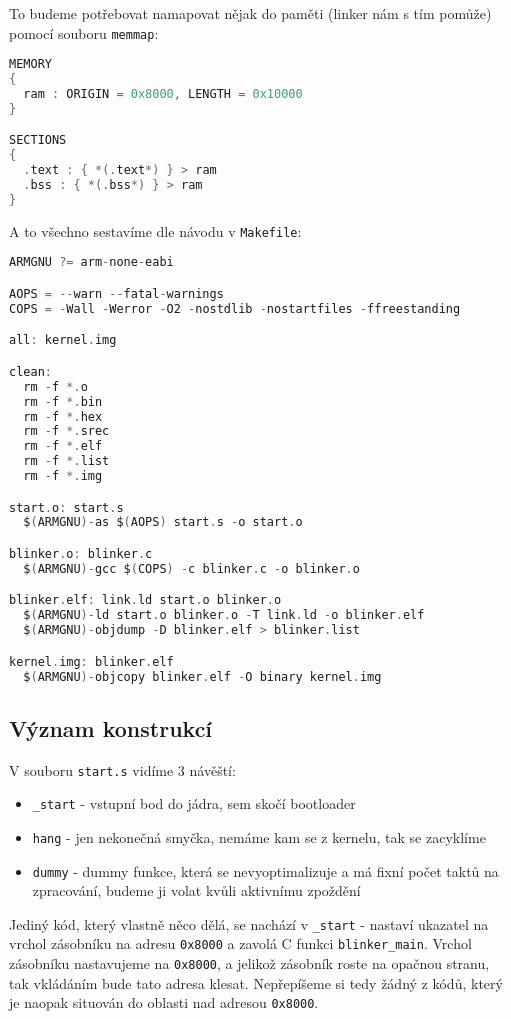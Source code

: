 \documentclass{article}
\begin{document}
To budeme potřebovat namapovat nějak do paměti (linker nám s tím pomůže) pomocí souboru \texttt{memmap}:

\begin{lstlisting}[language=C]
MEMORY
{
  ram : ORIGIN = 0x8000, LENGTH = 0x10000
}

SECTIONS
{
  .text : { *(.text*) } > ram
  .bss : { *(.bss*) } > ram
}
\end{lstlisting}

A to všechno sestavíme dle návodu v \texttt{Makefile}:

\begin{lstlisting}[language=C]
ARMGNU ?= arm-none-eabi

AOPS = --warn --fatal-warnings
COPS = -Wall -Werror -O2 -nostdlib -nostartfiles -ffreestanding

all: kernel.img

clean:
  rm -f *.o
  rm -f *.bin
  rm -f *.hex
  rm -f *.srec
  rm -f *.elf
  rm -f *.list
  rm -f *.img

start.o: start.s
  $(ARMGNU)-as $(AOPS) start.s -o start.o

blinker.o: blinker.c
  $(ARMGNU)-gcc $(COPS) -c blinker.c -o blinker.o

blinker.elf: link.ld start.o blinker.o
  $(ARMGNU)-ld start.o blinker.o -T link.ld -o blinker.elf
  $(ARMGNU)-objdump -D blinker.elf > blinker.list

kernel.img: blinker.elf
  $(ARMGNU)-objcopy blinker.elf -O binary kernel.img
\end{lstlisting}

\subsection{Význam konstrukcí}

V souboru \texttt{start.s} vidíme 3 návěští:
\begin{itemize}
	\item \texttt{\_start} - vstupní bod do jádra, sem skočí bootloader
	\item \texttt{hang} - jen nekonečná smyčka, nemáme kam se  z kernelu, tak se zacyklíme
	\item \texttt{dummy} - dummy funkce, která se nevyoptimalizuje a má fixní počet taktů na zpracování, budeme ji volat kvůli aktivnímu zpoždění
\end{itemize}

Jediný kód, který vlastně něco dělá, se nachází v \texttt{\_start} - nastaví ukazatel na vrchol zásobníku na adresu \texttt{0x8000} a zavolá C funkci \texttt{blinker\_main}. Vrchol zásobníku nastavujeme na \texttt{0x8000}, a jelikož zásobník roste na opačnou stranu, tak vkládáním bude tato adresa klesat. Nepřepíšeme si tedy žádný z kódů, který je naopak situován do oblasti nad adresou \texttt{0x8000}.
\end{document}
